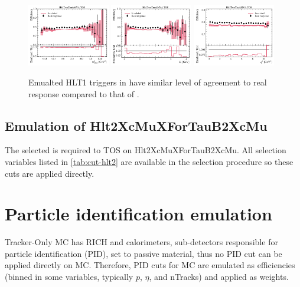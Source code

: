 \begin{figure}[ht]
    \includegraphics[width=0.32\textwidth]{
        ./figs-mc-emulation/emulate-hlt1/b0_Hlt1TwoTrackMVA_TOS_mmiss2.pdf
    }
    \includegraphics[width=0.32\textwidth]{
        ./figs-mc-emulation/emulate-hlt1/b0_Hlt1TwoTrackMVA_TOS_el.pdf
    }
    \includegraphics[width=0.32\textwidth]{
        ./figs-mc-emulation/emulate-hlt1/b0_Hlt1TwoTrackMVA_TOS_q2.pdf
    }

    \caption{
        Emualted HLT1 triggers in \Bz have similar level of agreement to real
        response compared to that of \Bp.
    }
    \label{fig:hlt1-twotrackmva-emu}
\end{figure}


\subsection{Emulation of Hlt2XcMuXForTauB2XcMu}

The selected \B is required to TOS on Hlt2XcMuXForTauB2XcMu. All selection
variables listed in \cref{tab:cut-hlt2} are available in the selection procedure
so these cuts are applied directly.


\section{Particle identification emulation}
\label{sec:emulation-for-to-mc:pid}

Tracker-Only MC has RICH and calorimeters, sub-detectors responsible for
particle identification (PID), set to passive material, thus no PID cut can be
applied directly on MC.
Therefore, PID cuts for MC are emulated as efficiencies (binned in some
variables, typically $p$, $\eta$, and nTracks) and applied as weights.

